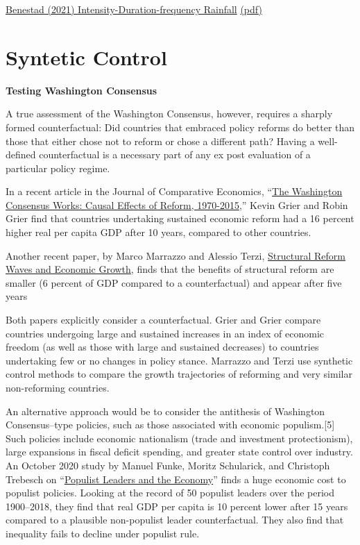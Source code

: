 \documentclass[
]{book}
\begin{document}
\href{https://iopscience.iop.org/article/10.1088/1748-9326/abd4ab}{Benestad (2021) Intensity-Duration-frequency Rainfall}
\href{pdf/Benestad_2021_Intensity_Duration_Frequency.pdf}{(pdf)}

\hypertarget{syntetic-control}{%
\chapter{Syntetic Control}\label{syntetic-control}}

\textbf{Testing Washington Consensus}

A true assessment of the Washington Consensus, however, requires a sharply formed counterfactual: Did countries that embraced policy reforms do better than those that either chose not to reform or chose a different path? Having a well-defined counterfactual is a necessary part of any ex post evaluation of a particular policy regime.

In a recent article in the Journal of Comparative Economics, ``\href{https://www.sciencedirect.com/science/article/pii/S0147596720300639}{The Washington Consensus Works: Causal Effects of Reform, 1970-2015},'' Kevin Grier and Robin Grier find that countries undertaking sustained economic reform had a 16 percent higher real per capita GDP after 10 years, compared to other countries.

Another recent paper, by Marco Marrazzo and Alessio Terzi, \href{https://papers.ssrn.com/sol3/papers.cfm?abstract_id=3071545}{Structural Reform Waves and Economic Growth}, finds that the benefits of structural reform are smaller (6 percent of GDP compared to a counterfactual) and appear after five years

Both papers explicitly consider a counterfactual. Grier and Grier compare countries undergoing large and sustained increases in an index of economic freedom (as well as those with large and sustained decreases) to countries undertaking few or no changes in policy stance. Marrazzo and Terzi use synthetic control methods to compare the growth trajectories of reforming and very similar non-reforming countries.

An alternative approach would be to consider the antithesis of Washington Consensus--type policies, such as those associated with economic populism.{[}5{]} Such policies include economic nationalism (trade and investment protectionism), large expansions in fiscal deficit spending, and greater state control over industry. An October 2020 study by Manuel Funke, Moritz Schularick, and Christoph Trebesch on ``\href{https://t.co/R5qYmjA3I8?amp=1}{Populist Leaders and the Economy}'' finds a huge economic cost to populist policies.
Looking at the record of 50 populist leaders over the period 1900--2018, they find that real GDP per capita is 10 percent lower after 15 years compared to a plausible non-populist leader counterfactual. They also find that inequality fails to decline under populist rule.
\end{document}
